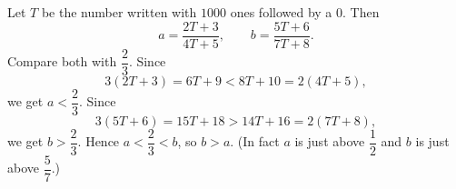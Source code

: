 Let $T$ be the number written with $1000$ ones followed by a $0$. Then
\[
a=\dfrac{2T+3}{4T+5},\qquad b=\dfrac{5T+6}{7T+8}.
\]
Compare both with $\dfrac{2}{3}$. Since
\[
3(2T+3)=6T+9<8T+10=2(4T+5),
\]
we get $a<\dfrac{2}{3}$. Since
\[
3(5T+6)=15T+18>14T+16=2(7T+8),
\]
we get $b>\dfrac{2}{3}$. Hence $a<\dfrac{2}{3}<b$, so $\boxed{b>a}$. (In fact $a$ is just above $\dfrac{1}{2}$ and $b$ is just above $\dfrac{5}{7}$.)
